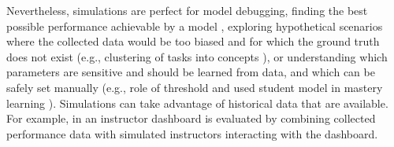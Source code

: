 Nevertheless, simulations are perfect for model debugging,
finding the best possible performance achievable by a model
\cite{mastery-overpractice-underpractice-tradeoff},
exploring hypothetical scenarios where the collected data would be too biased
and for which the ground truth does not exist
(e.g., clustering of tasks into concepts \cite[section\,3.3]{rihak-phd}),
or understanding which parameters are sensitive and should be learned from data,
and which can be safely set manually
(e.g., role of threshold and used student model in mastery learning
\cite{alg.mastery}). %
Simulations can take advantage of historical data that are available.
For example, in \cite{instructor-dashboard-realtime} an instructor dashboard is
evaluated by combining collected performance data %
with simulated instructors interacting with the dashboard.




%
%
%
